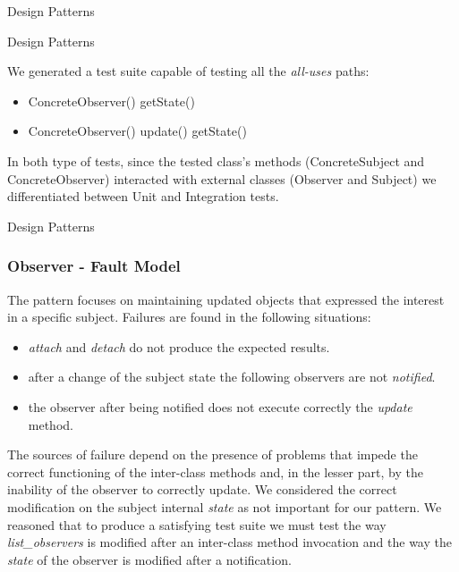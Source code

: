 \documentclass{beamer}
\begin{document}
\begin{section}{Design Patterns}
\begin{subsection}{Design Patterns}
\begin{frame}
We generated a test suite capable of testing all the \textit{all-uses} paths:
\begin{itemize}
	\item ConcreteObserver() getState()
	\item ConcreteObserver() update() getState()
	
\end{itemize}
In both type of tests, since the tested class's methods (ConcreteSubject and ConcreteObserver) interacted with external classes (Observer and Subject) we  differentiated between Unit and Integration tests.		
	\end{frame}
\end{subsection}

\begin{subsection}{Design Patterns}
	\begin{frame}
		\frametitle{Observer - Fault Model}
		The pattern focuses on maintaining updated objects that expressed the interest in a specific subject. Failures are found in the following situations:  
		\begin{itemize}
			\item \textit{attach} and \textit{detach} do not produce the expected results.
			\item after a change of the subject state the following observers are not \textit{notified}.
			\item the observer after being notified does not execute correctly the \textit{update} method.
		\end{itemize}
		\vspace{5mm}
		The sources of failure depend on the presence of problems that impede the correct functioning of the inter-class methods and, in the lesser part, by the inability of the observer to correctly update. We considered the correct modification on the subject internal \textit{state} as not important for our pattern.  We reasoned that to produce a satisfying test suite we must test the way \textit{list\_observers} is modified after an inter-class method invocation and the way the \textit{state} of the observer is modified after a notification.
		
	\end{frame}
\end{subsection}


\end{section}
\end{document}
